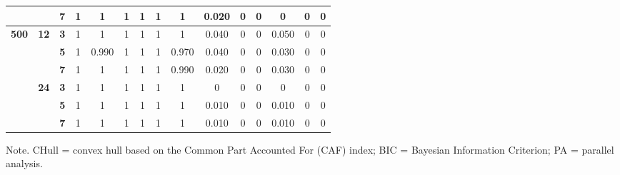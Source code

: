 \documentclass[a4paper,man,natbib]{apa6}
\begin{document}
\begin{table}[]
\begin{center}
{\begin{tabular}{ccccccccccccccc}
				&
				&
				\textbf{7} &
				1 &
				1 &
				1 &
				1 &
				1 &
				1 &
				0.020 &
				0 &
				0 &
				0 &
				0 &
				0 \\ \hline
				\multirow{6}{*}{\textbf{500}} &
				\multirow{3}{*}{\textbf{12}} &
				\textbf{3} &
				1 &
				1 &
				1 &
				1 &
				1 &
				1 &
				0.040 &
				0 &
				0 &
				0.050 &
				0 &
				0 \\ \cline{3-15} 
				&
				&
				\textbf{5} &
				1 &
				0.990 &
				1 &
				1 &
				1 &
				0.970 &
				0.040 &
				0 &
				0 &
				0.030 &
				0 &
				0 \\ \cline{3-15} 
				&
				&
				\textbf{7} &
				1 &
				1 &
				1 &
				1 &
				1 &
				0.990 &
				0.020 &
				0 &
				0 &
				0.030 &
				0 &
				0 \\ \cline{2-15} 
				&
				\multirow{3}{*}{\textbf{24}} &
				\textbf{3} &
				1 &
				1 &
				1 &
				1 &
				1 &
				1 &
				0 &
				0 &
				0 &
				0 &
				0 &
				0 \\ \cline{3-15} 
				&
				&
				\textbf{5} &
				1 &
				1 &
				1 &
				1 &
				1 &
				1 &
				0.010 &
				0 &
				0 &
				0.010 &
				0 &
				0 \\ \cline{3-15} 
				&
				&
				\textbf{7} &
				1 &
				1 &
				1 &
				1 &
				1 &
				1 &
				0.010 &
				0 &
				0 &
				0.010 &
				0 &
				0 \\ \hline
			\end{tabular}%
		}
	\end{center}
	\begin{tablenotes}[flushleft]
		\small
		\item 	Note. CHull = convex hull based on the Common Part Accounted For (CAF) index; BIC = Bayesian Information Criterion; PA = parallel analysis.
	\end{tablenotes}
\end{table}


\end{document}
